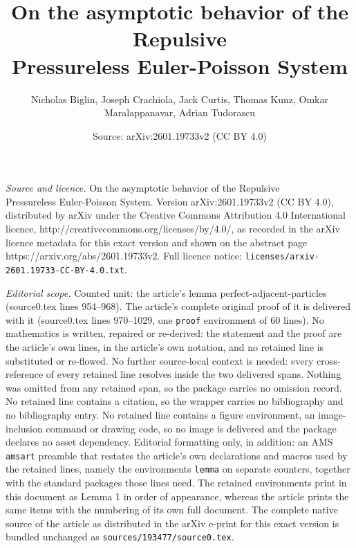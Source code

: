 \documentclass[10pt,a4paper]{amsart}
\title{On the asymptotic behavior of the Repulsive \\ Pressureless Euler-Poisson System}
\author{Nicholas Biglin, Joseph Crachiola, Jack Curtis, Thomas Kunz, Omkar Maralappanavar, Adrian Tudorascu}
\date{Source: arXiv:2601.19733v2 (CC BY 4.0)}
\begin{document}
\maketitle

\noindent\emph{Source and licence.} On the asymptotic behavior of the Repulsive \\ Pressureless Euler-Poisson System. Version arXiv:2601.19733v2 (CC BY 4.0), distributed by arXiv under the Creative Commons Attribution 4.0 International licence, http://creativecommons.org/licenses/by/4.0/, as recorded in the arXiv licence metadata for this exact version and shown on the abstract page https://arxiv.org/abs/2601.19733v2. Full licence notice: \texttt{licenses/arxiv-2601.19733-CC-BY-4.0.txt}.\par\smallskip

\noindent\textit{Editorial scope.} Counted unit: the article's lemma perfect-adjacent-particles (source0.tex lines 954--968). The article's complete original proof of it is delivered with it (source0.tex lines 970--1029, one \texttt{proof} environment of 60 lines). No mathematics is written, repaired or re-derived: the statement and the proof are the article's own lines, in the article's own notation, and no retained line is substituted or re-flowed.  No further source-local context is needed: every cross-reference of every retained line resolves inside the two delivered spans.  Nothing was omitted from any retained span, so the package carries no omission record.  No retained line contains a citation, so the wrapper carries no bibliography and no bibliography entry.  No retained line contains a figure environment, an image-inclusion command or drawing code, so no image is delivered and the package declares no asset dependency.  Editorial formatting only, in addition: an AMS \texttt{amsart} preamble that restates the article's own declarations and macros used by the retained lines, namely the environments \texttt{lemma} on separate counters, together with the standard packages those lines need.  The retained environments print in this document as Lemma 1 in order of appearance, whereas the article prints the same items with the numbering of its own full document.  The complete native source of the article as distributed in the arXiv e-print for this exact version is bundled unchanged as \texttt{sources/193477/source0.tex}.
\end{document}
